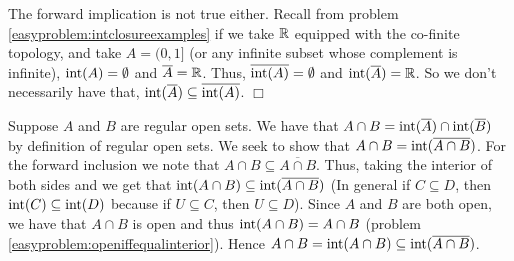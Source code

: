 \documentclass{article}
\begin{document}
{\begin{spacedenumerate}
    The forward implication is not true either. Recall from problem \ref{easyproblem:intclosureexamples} if we take $\mathbb{R}$ equipped with the co-finite topology, and take $A = (0,1]$ (or any infinite subset whose complement is infinite), $\operatorname{int}(A) = \emptyset$ and $\overline{A} = \mathbb{R}$. Thus, $\overline{\operatorname{int}(A)} = \emptyset$ and $\operatorname{int}(\overline{A}) = \mathbb{R}$. So we don't necessarily have that, $\operatorname{int}(\overline{A})\subseteq \overline{\operatorname{int}(A)} $. $\Box$
    \item Suppose $A$ and $B$ are regular open sets. We have that $A\cap B = \operatorname{int}(\overline{A})\cap \operatorname{int}(\overline{B})$ by definition of regular open sets. We seek to show that $A\cap B = \operatorname{int}(\overline{A\cap B})$. For the forward inclusion we note that $A\cap B\subseteq \overline{A\cap B}$. Thus, taking the interior of both sides and we get that $\operatorname{int}(A\cap B)\subseteq \operatorname{int}(\overline{A\cap B})$ (In general if $C\subseteq D$, then $\operatorname{int}(C)\subseteq \operatorname{int}(D)$ because if $U\subseteq C$, then $U\subseteq D$). Since $A$ and $B$ are both open, we have that $A\cap B$ is open and thus $\operatorname{int}(A\cap B) = A\cap B$ (problem \ref{easyproblem:openiffequalinterior}). Hence $A\cap B = \operatorname{int}(A\cap B)\subseteq \operatorname{int}(\overline{A\cap B})$. 
    

\end{spacedenumerate}}
\end{document}
